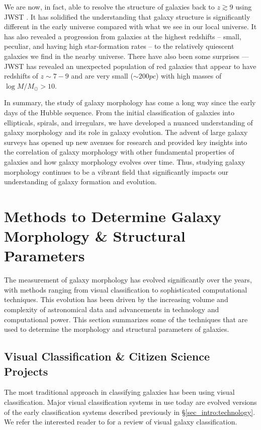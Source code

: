 We are now, in fact, able to resolve the structure of galaxies back to $z \gtrsim 9$ using JWST \citep[e.g.,][]{labbe_23,finkelstein_23, kartaltepe_23}. It has solidified the understanding that galaxy structure is significantly different in the early universe compared with what we see in our local universe. It has also revealed a progression from galaxies at the highest redshifts -- small, peculiar, and having high star-formation rates -- to the relatively quiescent galaxies we find in the nearby universe. There have also been some surprises --- JWST has revealed an unexpected population of red galaxies that appear to have redshifts of $z \sim 7 − 9$ and are very small ($\sim 200 pc$) with high masses of $\log M/M_{\odot} > 10$.

In summary, the study of galaxy morphology has come a long way since the early days of the Hubble sequence. From the initial classification of galaxies into ellipticals, spirals, and irregulars, we have developed a nuanced understanding of galaxy morphology and its role in galaxy evolution. The advent of large galaxy surveys has opened up new avenues for research and provided key insights into the correlation of galaxy morphology with other fundamental properties of galaxies and how galaxy morphology evolves over time. Thus, studying galaxy morphology continues to be a vibrant field that significantly impacts our understanding of galaxy formation and evolution. 


\section{Methods to Determine Galaxy Morphology \& Structural Parameters} \label{sec_intro:determining_morph}

The measurement of galaxy morphology has evolved significantly over the years, with methods ranging from visual classification to sophisticated computational techniques. This evolution has been driven by the increasing volume and complexity of astronomical data and advancements in technology and computational power. This section summarizes some of the techniques that are used to determine the morphology and structural parameters of galaxies.

\subsection{Visual Classification \& Citizen Science Projects} \label{sec_intro:trad_morph}

The most traditional approach in classifying galaxies has been using visual classification. Major visual classification systems in use today are evolved versions of the early classification systems described previously in \S \ref{sec_intro:technology}. We refer the interested reader to \citet{buta_13} for a review of visual galaxy classification. 

